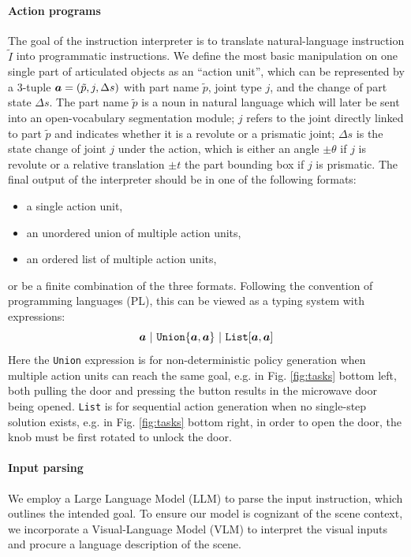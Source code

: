 \paragraph{Action programs}
The goal of the instruction interpreter is to translate natural-language instruction $\tilde{I}$ into programmatic instructions.
We define the most basic manipulation on one single part of articulated objects as an ``action unit'', which can be represented by a 3-tuple ${\bm{a}} = (\tilde{p}, j, \Delta s)$ with part name $\tilde{p}$, joint type $j$, and the change of part state $\Delta s$.
The part name $\tilde{p}$ is a noun in natural language which will later be sent into an open-vocabulary segmentation module; $j$ refers to the joint directly linked to part $\tilde{p}$ and indicates whether it is a revolute or a prismatic joint; $\Delta s$ is the state change of joint $j$ under the action, which is either an angle $\pm\theta$ if $j$ is revolute or a relative translation $\pm t$ \wrt the part bounding box if $j$ is prismatic.
%
The final output of the interpreter should be in one of the following formats:
\begin{itemize}
    \item a single action unit,
    \item an unordered union of multiple action units,
    \item an ordered list of multiple action units,
\end{itemize}
or be a finite combination of the three formats.
%
Following the convention of programming languages (PL), this can be viewed as a typing system with expressions:
\begin{equation*}
    {\bm{a}} ~|~ \texttt{Union}\{{\bm{a}},{\bm{a}}\} ~|~ \texttt{List}[{\bm{a}},{\bm{a}}]
\end{equation*}
Here the \texttt{Union} expression is for non-deterministic policy generation when multiple action units can reach the same goal, e.g. in Fig. \ref{fig:tasks} bottom left, both pulling the door and pressing the button results in the microwave door being opened.
\texttt{List} is for sequential action generation when no single-step solution exists, e.g. in Fig. \ref{fig:tasks} bottom right, in order to open the door, the knob must be first rotated to unlock the door.




\paragraph{Input parsing}
We employ a Large Language Model (LLM) to parse the input instruction, which outlines the intended goal. 
To ensure our model is cognizant of the scene context, we incorporate a Visual-Language Model (VLM) to interpret the visual inputs and procure a language description of the scene.

